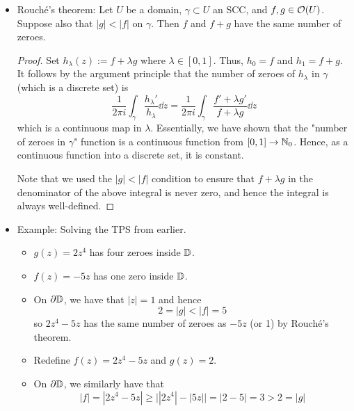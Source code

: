 \documentclass[../notes.tex]{subfiles}
\begin{document}
\begin{itemize}
    \begin{itemize}
        \item This computation is another proof of the argument principle!
    \end{itemize}
    \item Rouch\'{e}'s theorem: Let $U$ be a domain, $\gamma\subset U$ an SCC, and $f,g\in\mathcal{O}(U)$. Suppose also that $|g|<|f|$ on $\gamma$. Then $f$ and $f+g$ have the same number of zeroes.
    \begin{proof}
        Set $h_\lambda(z):=f+\lambda g$ where $\lambda\in[0,1]$. Thus, $h_0=f$ and $h_1=f+g$. It follows by the argument principle that the number of zeroes of $h_\lambda$ in $\gamma$ (which is a discrete set) is
        \begin{equation*}
            \frac{1}{2\pi i}\int_\gamma\frac{h_\lambda'}{h_\lambda}\dd{z} = \frac{1}{2\pi i}\int_\gamma\frac{f'+\lambda g'}{f+\lambda g}\dd{z}
        \end{equation*}
        which is a continuous map in $\lambda$. Essentially, we have shown that the "number of zeroes in $\gamma$" function is a continuous function from $[0,1]\to\mathbb{N}_0$. Hence, as a continuous function into a discrete set, it is constant.\par
        Note that we used the $|g|<|f|$ condition to ensure that $f+\lambda g$ in the denominator of the above integral is never zero, and hence the integral is always well-defined.
    \end{proof}
    \item Example: Solving the TPS from earlier.
    \begin{itemize}
        \item $g(z)=2z^4$ has four zeroes inside $\mathbb{D}$.
        \item $f(z)=-5z$ has one zero inside $\mathbb{D}$.
        \item On $\partial\mathbb{D}$, we have that $|z|=1$ and hence
        \begin{equation*}
            2 = |g| < |f| = 5
        \end{equation*}
        so $2z^4-5z$ has the same number of zeroes as $-5z$ (or 1) by Rouch\'{e}'s theorem.
        \item Redefine $f(z)=2z^4-5z$ and $g(z)=2$.
        \item On $\partial\mathbb{D}$, we similarly have that
        \begin{equation*}
            |f| = |2z^4-5z|
            \geq \big| |2z^4|-|5z| \big|
            = |2-5|
            = 3
            > 2
            = |g|

\end{equation*}
\end{itemize}
\end{itemize}
\end{document}
